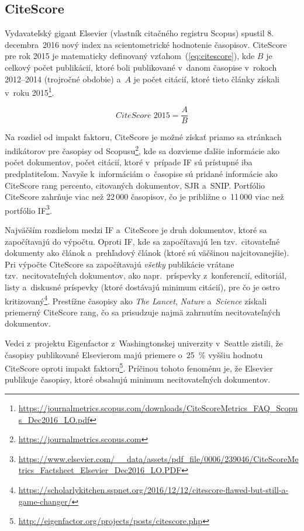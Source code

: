 \subsection{CiteScore}
\label{sec:citescore}

Vydavateľský gigant Elsevier (vlastník citačného registru
Scopus) spustil 8.\,decembra~2016 nový index na scientometrické hodnotenie časopisov.  CiteScore
pre rok 2015 je matematicky definovaný vzťahom~(\ref{eq:citescore}), kde $B$ je
celkový počet publikácií, ktoré boli publikované v~danom časopise v~rokoch
2012--2014 (trojročné obdobie) a~$A$ je počet citácií, ktoré tieto články získali
v~roku
2015\footnote{\url{https://journalmetrics.scopus.com/downloads/CiteScoreMetrics_FAQ_Scopus_Dec2016_LO.pdf}}.

\begin{equation}
\label{eq:citescore}
CiteScore\; 2015 = \frac{A}{B}
\end{equation}

Na rozdiel od impakt faktoru, CiteScore je možné získať priamo sa stránkach
indikátorov pre časopisy od
Scopusu\footnote{\url{https://journalmetrics.scopus.com}}, kde sa dozvieme
ďalšie informácie ako počet dokumentov, počet citácií, ktoré v~prípade IF sú
prístupné iba predplatiteľom.  Navyše k~informáciám o~časopise sú pridané
informácie ako CiteScore rang percento, citovaných dokumentov, SJR a~SNIP.
Portfólio CiteScore zahrňuje viac než 22\,000 časopisov, čo je približne
o~11\,000 viac než portfólio
IF\footnote{\url{https://www.elsevier.com/__data/assets/pdf_file/0006/239046/CiteScoreMetrics_Factsheet_Elsevier_Dec2016_LO.PDF}}.

Najväčším rozdielom medzi IF a~CiteScore je druh dokumentov, ktoré sa
započítavajú do výpočtu.  Oproti IF, kde sa započítavajú len tzv.~citovateľné
dokumenty ako článok a~prehľadový článok (ktoré sú väčšinou najcitovanejšie).
Pri výpočte CiteScore sa započítavajú \emph{všetky} publikácie vrátane
tzv.~necitovateľných dokumentov, ako napr.~príspevky z~konferencií, editoriál,
listy a~diskusné príspevky (ktoré dostávajú minimum citácií), pre čo je ostro
kritizovaný\footnote{\url{https://scholarlykitchen.sspnet.org/2016/12/12/citescore-flawed-but-still-a-game-changer/}}.
Prestížne časopisy ako \emph{The Lancet}, \emph{Nature} a~\emph{Science} získali
priemerný CiteScore rang, čo sa prisudzuje najmä zahrnutím necitovateľných
dokumentov.

Vedci z~projektu Eigenfactor z~Washingtonskej univerzity v~Seattle zistili, že
časopisy publikované Elsevierom majú priemere o~25~\% vyššiu hodnotu CiteScore
oproti impakt
faktoru\footnote{\url{http://eigenfactor.org/projects/posts/citescore.php}}.
Príčinou tohoto fenoménu je, že Elsevier publikuje časopisy, ktoré obsahujú
minimum necitovateľných dokumentov.

